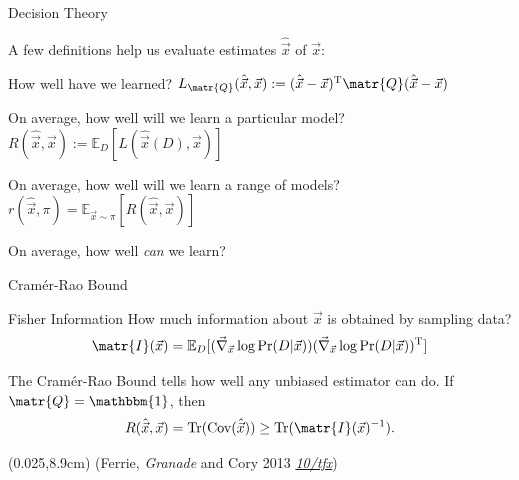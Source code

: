 \documentclass[xcolor=dvipsnames, compress]{beamer}
\renewcommand\UrlFont{\color{red}\rmfamily\itshape}
\newcommand{\shortdoi}[1]{\href{http://doi.org/#1}{\UrlFont 10/#1}}
\newcommand{\T}{\mathrm{T}}
\newcommand{\Cov}{\operatorname{Cov}}
\newcommand{\Tr}{\operatorname{Tr}}
\newcommand{\expect}{\mathbb{E}}
\newcommand{\id}{\mathbbm{1}}
\newcommand{\defeq}{\mathrel{:=}}
\newcommand{\bottomnote}[1]{
  \begin{textblock*}{0.95\paperwidth} (0.025\paperwidth,8.9cm)
    {\tiny \hfill #1}
  \end{textblock*}
}
\begin{document}
\begin{frame}{Decision Theory}

  A few definitions help us evaluate estimates $\hat{\vec{x}}$ of $\vec{x}$:

  \begin{description}[<+->]
    \item[Loss]       How well have we learned?
      $L_{\matr{Q}}(\hat{\vec{x}}, \vec{x}) \defeq (\hat{\vec{x}} - \vec{x})^{\T} \matr{Q} (\hat{\vec{x}} - \vec{x})$
    \item[Risk]       On average, how well will we learn a particular model?\\
      $R(\hat{\vec{x}}, \vec{x}) \defeq \expect_D [L(\hat{\vec{x}}(D), \vec{x})]$
    \item[Bayes risk] On average, how well will we learn a range of models?\\
      $r(\hat{\vec{x}}, \pi) = \expect_{\vec{x} \sim \pi}[R(\hat{\vec{x}}, \vec{x})]$
    \item[Cram\'er-Rao Bound] On average, how well \emph{can} we learn?
  \end{description}

\end{frame}

\begin{frame}{Cram\'er-Rao Bound}

  \begin{block}{Fisher Information}
    How much information about $\vec{x}$ is obtained
    by sampling data?
    \[
      \matr{I}(\vec{x}) = \expect_D[
        (\vec{\nabla}_{\vec{x}}\log\Pr(D | \vec{x}))
        (\vec{\nabla}_{\vec{x}}\log\Pr(D | \vec{x}))^\T
      ]
    \]
  \end{block}

  \pause
  
  The Cram\'er-Rao Bound tells how well any unbiased estimator
  can do. If $\matr{Q} = \id$, then
  \[
    R(\hat{\vec{x}}, \vec{x}) = \Tr(\Cov(\hat{\vec{x}})) \ge \Tr(\matr{I}(\vec{x})^{-1}).
  \]

  \bottomnote{(Ferrie, \emph{Granade} and Cory 2013 \shortdoi{tfx})}
 
\end{frame}
\end{document}
